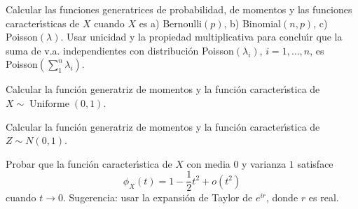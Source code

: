 
\begin{problem}[4]  Calcular las funciones generatrices de probabilidad, de momentos y las funciones caracter\'{\i}sticas de $X$ cuando $X$ es
a) Bernoulli$(p)$,
b) Binomial$(n,p)$,
c) Poisson$(\lambda)$. Usar unicidad y la propiedad multiplicativa para conclu\'{\i}r que la suma de v.a. independientes
con distribuci\'on Poisson$(\lambda_i)$, $i = 1, \dots, n$, es Poisson$(\sum_1^n \lambda_i)$.
\solution

\begin{expla}

\end{expla}

\end{problem}


\begin{problem}[5] Calcular la funci\'on generatriz de momentos y la funci\'on caracter\'{\i}stica de $X\sim \operatorname{Uniforme}(0,1)$. 
\solution

\begin{expla}

\end{expla}

\end{problem}


\begin{problem}[6]Calcular la funci\'on generatriz de momentos y la funci\'on caracter\'{\i}stica de $Z\sim N(0,1)$. 
 
\solution

\begin{expla}

\end{expla}

\end{problem}


\begin{problem}[7]Probar que la funci\'on caracter\'{\i}stica de $X$ con media 0 y varianza $1$
satisface
$$
\phi_X(t) = 1 - \frac{1}{2} t^2   + o(t^2)
$$ 
cuando $t\to 0$. Sugerencia: usar la expansi\'on de Taylor de $e^{ir}$, donde $r$ es real.
\solution

\begin{expla}

\end{expla}

\end{problem}

